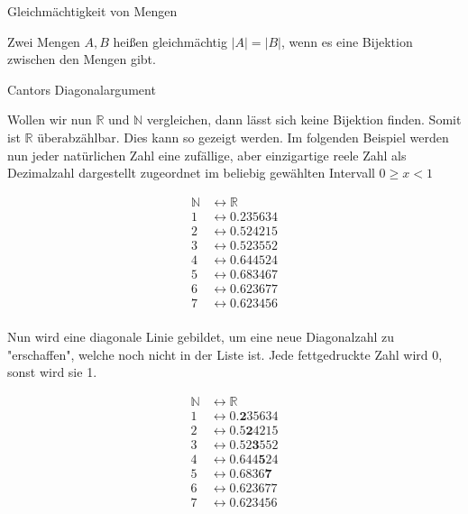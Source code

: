 \documentclass[headsepline,12pt,a4paper]{scrartcl}
\begin{document}
\begin{center}
\item[Gleichmächtigkeit von Mengen]
\end{center}
\item Zwei Mengen $A,B$ heißen gleichmächtig $ |A| = |B| $, wenn es eine Bijektion zwischen den Mengen gibt.

\newpage
\begin{center}
\item[Cantors Diagonalargument]
\end{center}
\item Wollen wir nun $\mathbb{R}$ und $\mathbb{N}$ vergleichen, dann lässt sich keine Bijektion finden. Somit ist $\mathbb{R}$ überabzählbar. Dies kann so gezeigt werden. Im folgenden Beispiel werden nun jeder natürlichen Zahl eine zufällige, aber einzigartige reele Zahl als Dezimalzahl dargestellt zugeordnet im beliebig gewählten Intervall $ 0 \geq x < 1 $ 

\begin{equation} 
 \begin{aligned} 
  \mathbb{N} &\leftrightarrow \mathbb{R} \\ 
     1 &\leftrightarrow 0.235634\\ 
     2 &\leftrightarrow 0.524215\\
     3&\leftrightarrow  0.523552\\
     4&\leftrightarrow  0.644524\\
     5&\leftrightarrow  0.683467\\
     6&\leftrightarrow  0.623677\\
     7&\leftrightarrow  0.623456\\
 \end{aligned} 
\end{equation}

Nun wird eine diagonale Linie gebildet, um eine neue Diagonalzahl zu "erschaffen", welche noch nicht in der Liste ist. Jede fettgedruckte Zahl wird 0, sonst wird sie 1. 

\begin{equation} 
 \begin{aligned} 
  \mathbb{N} &\leftrightarrow \mathbb{R} \\ 
     1 &\leftrightarrow 0.\textbf{2}35634\\ 
     2 &\leftrightarrow 0.5\textbf{2}4215\\
     3&\leftrightarrow  0.52\textbf{3}552\\
     4&\leftrightarrow  0.644\textbf{5}24\\
     5&\leftrightarrow  0.6836\textbf{7}\\
     6&\leftrightarrow  0.623677\\
     7&\leftrightarrow  0.623456\\
 \end{aligned} 
\end{equation}
\end{document}
